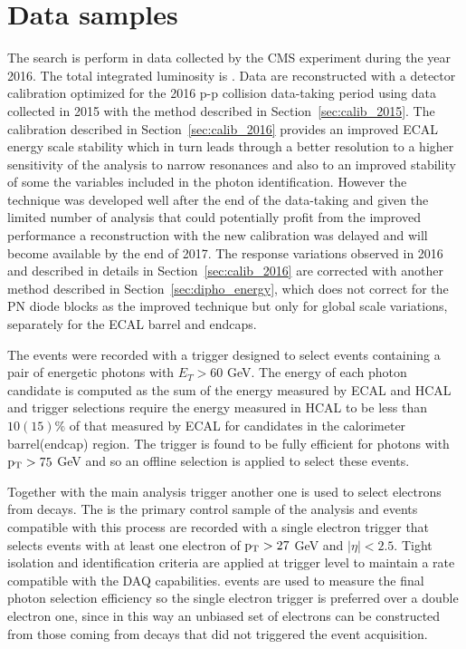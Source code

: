 \section{Data samples}
\label{sec:diphotons_data_samples}
The search is perform in data collected by the CMS experiment during the year 2016. The total
integrated luminosity is \lumisix. Data are reconstructed with a detector calibration optimized
for the 2016 p-p collision data-taking period using data collected in 2015 with the method described in
Section~\ref{sec:calib_2015}. The calibration described in Section~\ref{sec:calib_2016}
provides an improved ECAL energy scale stability which in turn leads through a better resolution
to a higher sensitivity of the analysis to narrow resonances and also to an improved stability
of some the variables included in the photon identification. However the technique was developed
well after the end of the data-taking and given the limited number of analysis that could potentially
profit from the improved performance a reconstruction with the new calibration was delayed and will become
available by the end of 2017. The response variations observed in 2016 and described in details in Section~\ref{sec:calib_2016}
are corrected with another method described in Section~\ref{sec:dipho_energy},
which does not correct for the PN diode blocks as the improved technique but only for global scale variations, separately
for the ECAL barrel and endcaps.

The events were recorded with a trigger designed to select events containing a pair of
energetic photons with $E_T > 60$ GeV. The energy of each photon candidate is computed as
the sum of the energy measured by ECAL and HCAL and trigger selections require
the energy measured in HCAL to be less than $10(15)\%$ of that measured by ECAL for candidates
in the calorimeter barrel(endcap) region.
The trigger is found to be fully efficient for photons with $\mathrm{p_{T}} > 75$ GeV and so an offline
selection is applied to select these events.

Together with the main analysis trigger another one is used to select electrons from \Zee decays.
The \Zee is the primary control sample of the analysis and events compatible with this process
are recorded with a single electron trigger that selects events with at least one electron of
$\mathrm{p_{T}} > 27$ GeV and $|\eta| < 2.5$. Tight isolation and identification criteria are applied at trigger
level to maintain a rate compatible with the DAQ capabilities.
\Zee events are used to measure the final photon selection efficiency so the single electron trigger
is preferred over a double electron one, since in this way an unbiased set of electrons can be
constructed from those coming from \Zee decays that did not triggered the event acquisition.

